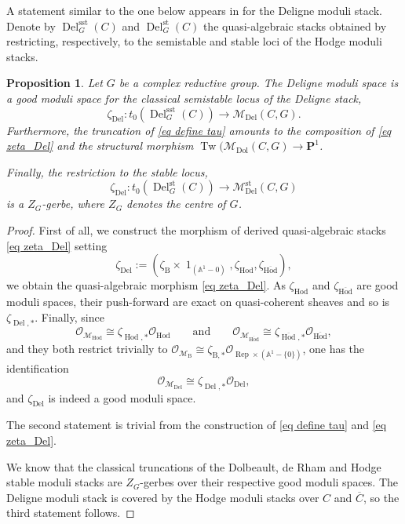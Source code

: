 \documentclass[11pt, a4paper]{amsart}
\numberwithin{equation}{section}
\newtheorem{proposition}[theorem]{Proposition}
\theoremstyle{definition}
\theoremstyle{remark}
\DeclareMathOperator{\id}{1}
\DeclareMathOperator{\Rep}{Rep}
\DeclareMathOperator{\Deligne}{Del}
\DeclareMathOperator{\Tw}{Tw}
\DeclareMathOperator{\Dol}{Dol}
\DeclareMathOperator{\Hod}{Hod}
\DeclareMathOperator{\Del}{Del}
\DeclareMathOperator{\sst}{sst}
\DeclareMathOperator{\st}{st}
\newcommand{\Mm}{\mathcal{M}}
\newcommand{\Oo}{\mathcal{O}}
\newcommand{\B}{\mathrm{B}}
\renewcommand{\P}{\mathbf{P}}
\newcommand{\ol}[1]{\overline{#1}}
\renewcommand{\AA}{\mathbb{A}}
\renewcommand{\to}{\longrightarrow}
\begin{document}
A statement similar to the one below appears in \cite{franco&hanson} for the Deligne moduli stack. Denote by $\Deligne_{G}^{\sst}(C)$ and $\Deligne_{G}^{\st}(C)$ the quasi-algebraic stacks obtained by restricting, respectively, to the semistable and stable loci of the Hodge moduli stacks.

\begin{proposition} \label{pr Del and Mm_Del}
\label{pr deligne moduli}
Let $G$ be a complex reductive group. The Deligne moduli space is a good moduli space for the classical semistable locus of the Deligne stack,
\begin{equation} \label{eq zeta_Del}
\zeta_{\Del} : t_0 \left ( \Deligne_{G}^{\sst}(C) \right ) \to \Mm_{\Del}(C,G).
\end{equation}
Furthermore, the truncation of \eqref{eq define tau} amounts to the composition of \eqref{eq zeta_Del} and the structural morphism $\Tw(\Mm_{\Dol}(C,G) \to \P^1$.

Finally, the restriction to the stable locus,
\begin{equation} \label{eq gerbe structure of Deligne^st}
\zeta_{\Del} : t_0 \left ( \Deligne_{G}^{\st}(C) \right ) \to \Mm_{\Del}^{\st}(C,G)
\end{equation}
is a $Z_G$-gerbe, where $Z_G$ denotes the centre of $G$.
\end{proposition}

\begin{proof}
First of all, we construct the morphism of derived quasi-algebraic stacks \eqref{eq zeta_Del} setting
\[
\zeta_{\Del} := \left ( \zeta_{\B} \times \id_{(\AA^1 - 0)}, \zeta_{\Hod}, \zeta_{\ol\Hod}  \right ),
\]
we obtain the quasi-algebraic morphism \eqref{eq zeta_Del}. As $\zeta_{\Hod}$ and $\zeta_{\ol \Hod}$ are good moduli spaces, their push-forward are exact on quasi-coherent sheaves and so is $\zeta_{\Del,*}$. Finally, since 
\[
\Oo_{\Mm_{\Hod}} \cong \zeta_{\Hod,*}\Oo_{\Hod} \qquad \text{and} \qquad \Oo_{\Mm_{\ol \Hod}} \cong \zeta_{\ol \Hod,*}\Oo_{\ol \Hod},
\]
and they both restrict trivially to $\Oo_{\Mm_{\B}} \cong \zeta_{\B,*}\Oo_{\Rep \times (\AA^1 - \{0 \})}$, one has the identification 
\[
\Oo_{\Mm_{\Del}} \cong \zeta_{\Del,*}\Oo_{\Del},
\]
and $\zeta_{\Del}$ is indeed a good moduli space. 

The second statement is trivial from the construction of \eqref{eq define tau} and \eqref{eq zeta_Del}.

We know that the classical truncations of the Dolbeault, de Rham and Hodge stable moduli stacks are $Z_G$-gerbes over their respective good moduli spaces. The Deligne moduli stack is covered by the Hodge moduli stacks over $C$ and $\ol C$, so the third statement follows.
\end{proof}
\end{document}
